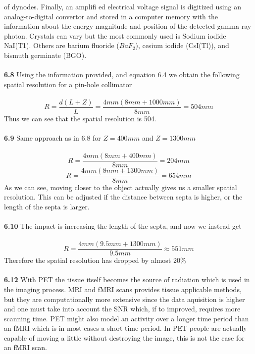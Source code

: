 \documentclass[]{article}
\begin{document}
of dynodes. Finally, an amplifi ed electrical voltage signal is digitized using an analog-to-digital convertor and stored in a computer memory with the information about the energy magnitude and position of the detected gamma ray photon. Crystals can vary but the most commonly used is Sodium iodide NaI(T1). Others are barium fluoride ($BaF_2$), cesium iodide (CsI(Tl)), and bismuth germinate (BGO).\\\\
\textbf{6.8} Using the information provided, and equation 6.4 we obtain the following spatial resolution for a pin-hole collimator\\\\
\begin{equation}
	R = \frac{d(L+Z)}{L} = \frac{4mm(8mm + 1000mm)}{8mm} = 504mm
\end{equation}
Thus we can see that the spatial resolution is 504.\\\\
\textbf{6.9} Same approach as in 6.8 for $Z = 400mm $ and $Z = 1300mm$\\\\
\begin{equation}
	R = \frac{4mm(8mm + 400mm)}{8mm} = 204mm
\end{equation}
\begin{equation}
	R = \frac{4mm(8mm + 1300mm)}{8mm} = 654mm
\end{equation}
As we can see, moving closer to the object actually gives us a smaller spatial resolution. This can be adjusted if the distance between septa is higher, or the length of the septa is larger.\\\\
\textbf{6.10} The impact is increasing the length of the septa, and now we instead get\\\\
 \begin{equation}
	R = \frac{4mm(9.5mm + 1300mm)}{9.5mm} \approx 551mm
\end{equation}
Therefore the spatial resolution has dropped by almost 20\%\\\\
\textbf{6.12} With PET the tissue itself becomes the source of radiation which is used in the imaging process. MRI and fMRI scans provides tissue applicable methods, but they are computationally more extensive since the data aquisition is higher and one must take into account the SNR which, if to improved, requires more scanning time. PET might also model an activity over a longer time period than an fMRI which is in most cases a short time period. In PET people are actually capable of moving a little without destroying the image, this is not the case for an fMRI scan.	\\\\
\end{document}
